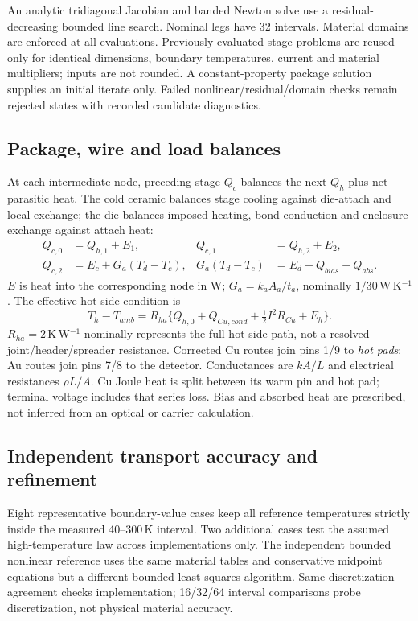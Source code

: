 \documentclass[11pt,a4paper]{article}
\begin{document}
An analytic tridiagonal Jacobian and banded Newton solve use a residual-decreasing bounded line search. Nominal legs have 32 intervals. Material domains are enforced at all evaluations. Previously evaluated stage problems are reused only for identical dimensions, boundary temperatures, current and material multipliers; inputs are not rounded. A constant-property package solution supplies an initial iterate only. Failed nonlinear/residual/domain checks remain rejected states with recorded candidate diagnostics.

\subsection{Package, wire and load balances}
At each intermediate node, preceding-stage $Q_c$ balances the next $Q_h$ plus net parasitic heat. The cold ceramic balances stage cooling against die-attach and local exchange; the die balances imposed heating, bond conduction and enclosure exchange against attach heat:
\begin{align}
Q_{c,0}&=Q_{h,1}+E_1, & Q_{c,1}&=Q_{h,2}+E_2,\\
Q_{c,2}&=E_c+G_a(T_d-T_c), & G_a(T_d-T_c)&=E_d+Q_{bias}+Q_{abs}.
\end{align}
$E$ is heat into the corresponding node in W; $G_a=k_aA_a/t_a$, nominally $1/30$\,W\,K$^{-1}$. The effective hot-side condition is
\begin{equation}
T_h-T_{amb}=R_{ha}\{Q_{h,0}+Q_{Cu,cond}+\tfrac12 I^2R_{Cu}+E_h\}.
\end{equation}
$R_{ha}=2$\,K\,W$^{-1}$ nominally represents the full hot-side path, not a resolved joint/header/spreader resistance. Corrected Cu routes join pins 1/9 to \emph{hot pads}; Au routes join pins 7/8 to the detector. Conductances are $kA/L$ and electrical resistances $\rho L/A$. Cu Joule heat is split between its warm pin and hot pad; terminal voltage includes that series loss. Bias and absorbed heat are prescribed, not inferred from an optical or carrier calculation.

\clearpage
\subsection{Independent transport accuracy and refinement}
Eight representative boundary-value cases keep all reference temperatures strictly inside the measured 40--300\,K interval. Two additional cases test the assumed high-temperature law across implementations only. The independent bounded nonlinear reference uses the same material tables and conservative midpoint equations but a different bounded least-squares algorithm. Same-discretization agreement checks implementation; 16/32/64 interval comparisons probe discretization, not physical material accuracy.
\end{document}
